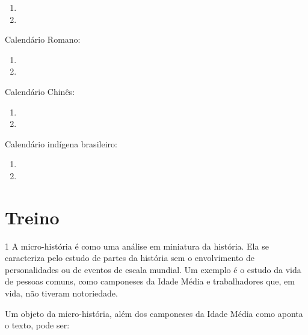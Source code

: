 \begin{enumerate}
\item {}

\item {}
\end{enumerate}

Calendário Romano:

\begin{enumerate}
\item {}

\item {}
\end{enumerate}

Calendário Chinês:

\begin{enumerate}
\item {}

\item {}
\end{enumerate}

Calendário indígena brasileiro:

\begin{enumerate}
\item {}

\item {}
\end{enumerate}

\pagebreak
\section{Treino}

\num{1} A micro-história é como uma análise em miniatura da história. Ela se caracteriza pelo estudo de partes da história sem o envolvimento de personalidades ou de eventos de escala mundial. Um
exemplo é o estudo da vida de pessoas comuns, como camponeses da Idade Média e trabalhadores que, em vida, não tiveram notoriedade.

Um objeto da micro-história, além dos camponeses da Idade Média como
aponta o texto, pode ser:

